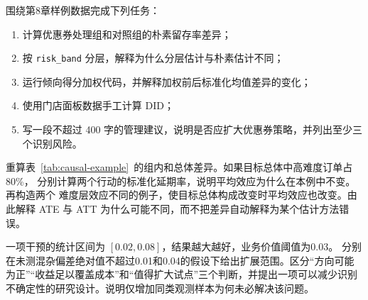 \begin{exercise}
围绕第8章样例数据完成下列任务：
\begin{enumerate}
  \item 计算优惠券处理组和对照组的朴素留存率差异；
  \item 按 \texttt{risk\_band} 分层，解释为什么分层估计与朴素估计不同；
  \item 运行倾向得分加权代码，并解释加权前后标准化均值差异的变化；
  \item 使用门店面板数据手工计算 DID；
  \item 写一段不超过 400 字的管理建议，说明是否应扩大优惠券策略，并列出至少三个识别风险。
\end{enumerate}
\end{exercise}

\begin{exercise}[标准化与目标总体]
重算表~\ref{tab:causal-example}~的组内和总体差异。如果目标总体中高难度订单占80\%，
分别计算两个行动的标准化延期率，说明平均效应为什么在本例中不变。再构造两个
难度层效应不同的例子，使目标总体构成改变时平均效应也改变。由此解释 ATE 与 ATT
为什么可能不同，而不把差异自动解释为某个估计方法错误。
\end{exercise}

\begin{exercise}[敏感性与行动强度]
一项干预的统计区间为 \([0.02,0.08]\)，结果越大越好，业务价值阈值为0.03。
分别在未测混杂偏差绝对值不超过0.01和0.04的假设下给出扩展范围。区分“方向可能
为正”“收益足以覆盖成本”和“值得扩大试点”三个判断，并提出一项可以减少识别
不确定性的研究设计。说明仅增加同类观测样本为何未必解决该问题。
\end{exercise}
